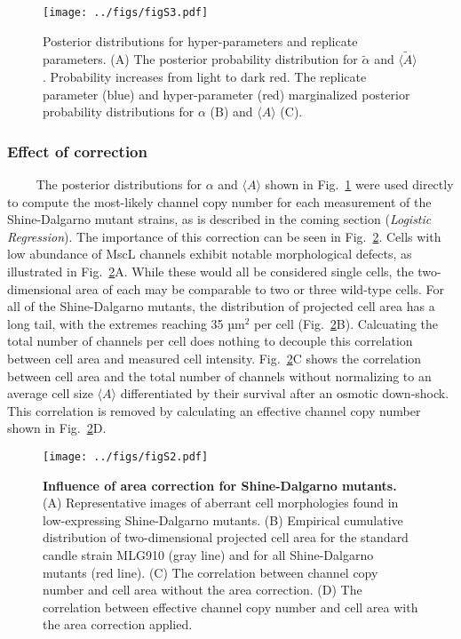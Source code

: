 \begin{figure}
\centering
\texttt{[image: ../figs/figS3.pdf]}
\caption{Posterior
distributions
for
hyper-parameters
and
replicate
parameters.
(A)
The
posterior
probability
distribution
for
\(\tilde{\alpha}\)
and
\(\tilde{\langle A \rangle}\).
Probability
increases
from
light
to
dark
red.
The
replicate
parameter
(blue)
and
hyper-parameter
(red)
marginalized
posterior
probability
distributions
for
\(\alpha\)
(B)
and
\(\langle A \rangle\)
(C).}\label{fig:posterior_samples}
\end{figure}

\subsubsection{Effect
of
correction}\label{effect-of-correction}

~~~~
The
posterior
distributions
for
\(\alpha\)
and
\(\langle A \rangle\)
shown
in
Fig.~\ref{fig:posterior_samples}
were
used
directly
to
compute
the
most-likely
channel
copy
number
for
each
measurement
of the
Shine-Dalgarno
mutant
strains,
as is
described
in the
coming
section
(\emph{Logistic
Regression}).
The
importance
of
this
correction
can be
seen
in
Fig.~\ref{fig:area_correction}.
Cells
with
low
abundance
of
MscL
channels
exhibit
notable
morphological
defects,
as
illustrated
in
Fig.~\ref{fig:area_correction}A.
While
these
would
all be
considered
single
cells,
the
two-dimensional
area
of
each
may be
comparable
to two
or
three
wild-type
cells.
For
all of
the
Shine-Dalgarno
mutants,
the
distribution
of
projected
cell
area
has a
long
tail,
with
the
extremes
reaching
35
µm\(^2\)
per
cell
(Fig.~\ref{fig:area_correction}B).
Calcuating
the
total
number
of
channels
per
cell
does
nothing
to
decouple
this
correlation
between
cell
area
and
measured
cell
intensity.
Fig.~\ref{fig:area_correction}C
shows
the
correlation
between
cell
area
and
the
total
number
of
channels
without
normalizing
to an
average
cell
size
\(\langle A \rangle\)
differentiated
by
their
survival
after
an
osmotic
down-shock.
This
correlation
is
removed
by
calculating
an
effective
channel
copy
number
shown
in
Fig.~\ref{fig:area_correction}D.

\begin{figure}
\centering
\texttt{[image: ../figs/figS2.pdf]}
\caption{\textbf{Influence
of
area
correction
for
Shine-Dalgarno
mutants.}
(A)
Representative
images
of
aberrant
cell
morphologies
found
in
low-expressing
Shine-Dalgarno
mutants.
(B)
Empirical
cumulative
distribution
of
two-dimensional
projected
cell
area
for
the
standard
candle
strain
MLG910
(gray
line)
and
for
all
Shine-Dalgarno
mutants
(red
line).
(C)
The
correlation
between
channel
copy
number
and
cell
area
without
the
area
correction.
(D)
The
correlation
between
effective
channel
copy
number
and
cell
area
with
the
area
correction
applied.}\label{fig:area_correction}
\end{figure}

